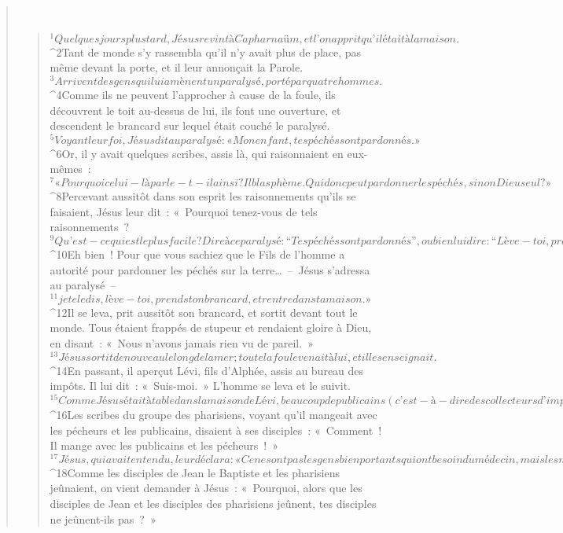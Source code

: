 \begin{verse}
         
      \bchapter{}
      \begin{verse}
${}^{1}Quelques jours plus tard, Jésus revint à Capharnaüm, et l’on apprit qu’il était à la maison. 
${}^{2}Tant de monde s’y rassembla qu’il n’y avait plus de place, pas même devant la porte, et il leur annonçait la Parole. 
${}^{3}Arrivent des gens qui lui amènent un paralysé, porté par quatre hommes. 
${}^{4}Comme ils ne peuvent l’approcher à cause de la foule, ils découvrent le toit au-dessus de lui, ils font une ouverture, et descendent le brancard sur lequel était couché le paralysé. 
${}^{5}Voyant leur foi, Jésus dit au paralysé : « Mon enfant, tes péchés sont pardonnés. »
${}^{6}Or, il y avait quelques scribes, assis là, qui raisonnaient en eux-mêmes : 
${}^{7}« Pourquoi celui-là parle-t-il ainsi ? Il blasphème. Qui donc peut pardonner les péchés, sinon Dieu seul ? » 
${}^{8}Percevant aussitôt dans son esprit les raisonnements qu’ils se faisaient, Jésus leur dit : « Pourquoi tenez-vous de tels raisonnements ? 
${}^{9}Qu’est-ce qui est le plus facile ? Dire à ce paralysé : “Tes péchés sont pardonnés”, ou bien lui dire : “Lève-toi, prends ton brancard et marche” ? 
${}^{10}Eh bien ! Pour que vous sachiez que le Fils de l’homme a autorité pour pardonner les péchés sur la terre… – Jésus s’adressa au paralysé – 
${}^{11}je te le dis, lève-toi, prends ton brancard, et rentre dans ta maison. » 
${}^{12}Il se leva, prit aussitôt son brancard, et sortit devant tout le monde. Tous étaient frappés de stupeur et rendaient gloire à Dieu, en disant : « Nous n’avons jamais rien vu de pareil. »
${}^{13}Jésus sortit de nouveau le long de la mer ; toute la foule venait à lui, et il les enseignait. 
${}^{14}En passant, il aperçut Lévi, fils d’Alphée, assis au bureau des impôts. Il lui dit : « Suis-moi. » L’homme se leva et le suivit.
${}^{15}Comme Jésus était à table dans la maison de Lévi, beaucoup de publicains (c’est-à-dire des collecteurs d’impôts) et beaucoup de pécheurs vinrent prendre place avec Jésus et ses disciples, car ils étaient nombreux à le suivre. 
${}^{16}Les scribes du groupe des pharisiens, voyant qu’il mangeait avec les pécheurs et les publicains, disaient à ses disciples : « Comment ! Il mange avec les publicains et les pécheurs ! » 
${}^{17}Jésus, qui avait entendu, leur déclara : « Ce ne sont pas les gens bien portants qui ont besoin du médecin, mais les malades. Je ne suis pas venu appeler des justes, mais des pécheurs. »
${}^{18}Comme les disciples de Jean le Baptiste et les pharisiens jeûnaient, on vient demander à Jésus : « Pourquoi, alors que les disciples de Jean et les disciples des pharisiens jeûnent, tes disciples ne jeûnent-ils pas ? » 

\end{verse}
\end{verse}
